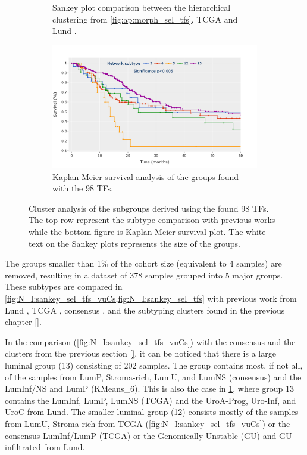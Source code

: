 \begin{figure}[!t]
\begin{subfigure}[!t]{0.49\textwidth}
    \caption{Sankey plot comparison between the hierarchical clustering from \cref{fig:ap:morph_sel_tfs}, TCGA \cite{Robertson2017-mg} and Lund \cite{Marzouka2018-ge}.}
    
    \label{fig:N_I:sankey_sel_tfs}
\end{subfigure}
\centering
\begin{subfigure}[!t]{0.7\textwidth}
    \includegraphics[width=1.0\textwidth,height=1.0\textheight,keepaspectratio]
    {Sections/Network_I/Resources/selective_pruning/survival_sel_tfs_cs.png}
    \caption{Kaplan-Meier survival analysis of the groups found with the 98 TFs. }
    \label{fig:N_I:sel_tfs_survival}
\end{subfigure} 

    \caption{Cluster analysis of the subgroups derived using the found 98 TFs. The top row represent the subtype comparison with previous works while the bottom figure is Kaplan-Meier survival plot. The white text on the Sankey plots represents the size of the groups.}
    \label{fig:N_I:sel_tfs_cs_analysis}
\end{figure}
 
The groups smaller than 1\% of the cohort size (equivalent to 4 samples) are removed, resulting in a dataset of 378 samples grouped into 5 major groups. These subtypes are compared in \cref{fig:N_I:sankey_sel_tfs_vuCs,fig:N_I:sankey_sel_tfs} with previous work from Lund \citet{Marzouka2018-ge}, TCGA \citet{Robertson2017-mg}, consensus \citet{Kamoun2020-tj}, and the subtyping clusters found in the previous chapter \ref{}. 

In the comparison (\cref{fig:N_I:sankey_sel_tfs_vuCs}) with the consensus and the clusters from the previous section \ref{}, it can be noticed that there is a large luminal group (13) consisting of 202 samples. The group contains most, if not all, of the samples from LumP, Stroma-rich, LumU, and LumNS (consensus) and the LumInf/NS and LumP (KMeans\_6). This is also the case in \cref{fig:N_I:sankey_sel_tfs}, where group 13 contains the LumInf, LumP, LumNS (TCGA) and the UroA-Prog, Uro-Inf, and UroC from Lund. The smaller luminal group (12) consists mostly of the samples from LumU, Stroma-rich from TCGA (\cref{fig:N_I:sankey_sel_tfs_vuCs}) or the consensus LumInf/LumP (TCGA) or the Genomically Unstable (GU) and GU-infiltrated from Lund. 

